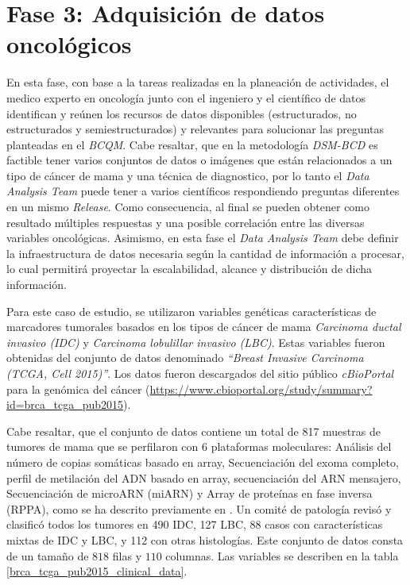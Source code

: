 \section{Fase 3: Adquisición de datos oncológicos}
En esta fase, con base a la tareas realizadas en la planeación de actividades, el medico experto en oncología junto con el ingeniero y el científico de datos identifican y reúnen los recursos de datos disponibles (estructurados, no estructurados y semiestructurados) y relevantes para solucionar las preguntas planteadas en el \textit{BCQM}. Cabe resaltar, que en la metodología \textit{\textit{DSM-BCD}} es factible tener varios conjuntos de datos o imágenes que están relacionados a un tipo de cáncer de mama y una técnica de diagnostico, por lo tanto  el \textit{Data Analysis Team} puede tener a varios científicos respondiendo preguntas diferentes en un mismo \textit{Release}. Como consecuencia, al final se pueden obtener como resultado múltiples respuestas y una posible correlación entre las diversas variables oncológicas.  Asimismo, en esta fase el \textit{Data Analysis Team} debe definir la infraestructura de datos necesaria según la cantidad de información a procesar, lo cual permitirá proyectar la escalabilidad, alcance y distribución de dicha información. 

Para este caso de estudio, se utilizaron variables genéticas características de marcadores tumorales  basados en los tipos de cáncer de mama  \textit{Carcinoma ductal invasivo (IDC)} y \textit{Carcinoma lobulillar invasivo (LBC)}. Estas variables fueron obtenidas del conjunto de datos denominado \textit{“Breast Invasive Carcinoma (TCGA, Cell 2015)”}. Los datos fueron descargados del sitio público \textit{cBioPortal} para la genómica del cáncer  (\url{https://www.cbioportal.org/study/summary?id=brca_tcga_pub2015}). 

Cabe resaltar, que el conjunto de datos contiene un total de 817 muestras de tumores de mama que  se perfilaron con 6 plataformas moleculares: Análisis del número de copias somáticas basado en array, Secuenciación del exoma completo, perfil de metilación del ADN basado en array, secuenciación del ARN mensajero, Secuenciación de microARN (miARN) y Array de proteínas en fase inversa (RPPA), como se ha descrito previamente en \cite{Bass2014}. Un comité de patología revisó y clasificó todos los tumores en 490 IDC, 127 LBC, 88 casos con características mixtas de IDC y LBC, y 112 con otras histologías. Este conjunto de datos consta de un tamaño de $818$ filas y $110$ columnas. Las variables se describen en la tabla \ref{brca_tcga_pub2015_clinical_data}. 

